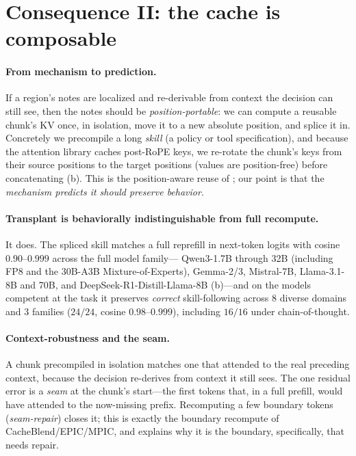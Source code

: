 \section{Consequence II: the cache is composable}
\label{sec:composable}

\paragraph{From mechanism to prediction.} If a region's notes are localized and re-derivable from context
the decision can still see, then the notes should be \emph{position-portable}: we can compute a reusable
chunk's KV once, in isolation, move it to a new absolute position, and splice it in. Concretely we
precompile a long \emph{skill} (a policy or tool specification), and because the attention library caches
post-RoPE keys, we re-rotate the chunk's keys from their source positions to the target positions (values
are position-free) before concatenating (b). This is the position-aware reuse of
\citet{liu2026cacheslide}; our point is that the \emph{mechanism predicts it should preserve behavior}.

\paragraph{Transplant is behaviorally indistinguishable from full recompute.} It does. The spliced skill
matches a full reprefill in next-token logits with cosine $0.90$--$0.999$ across the full model family---
Qwen3-1.7B through 32B (including FP8 and the 30B-A3B Mixture-of-Experts), Gemma-2/3, Mistral-7B,
Llama-3.1-8B and 70B, and DeepSeek-R1-Distill-Llama-8B (b)---and on the models competent at the task it
preserves \emph{correct} skill-following across $8$ diverse domains and $3$ families ($24/24$, cosine
$0.98$--$0.999$), including $16/16$ under chain-of-thought.

\paragraph{Context-robustness and the seam.} A chunk precompiled in isolation matches one that attended to
the real preceding context, because the decision re-derives from context it still sees. The one residual
error is a \emph{seam} at the chunk's start---the first tokens that, in a full prefill, would have
attended to the now-missing prefix. Recomputing a few boundary tokens (\emph{seam-repair}) closes it; this
is exactly the boundary recompute of CacheBlend/EPIC/MPIC, and  explains why it is
the boundary, specifically, that needs repair.

